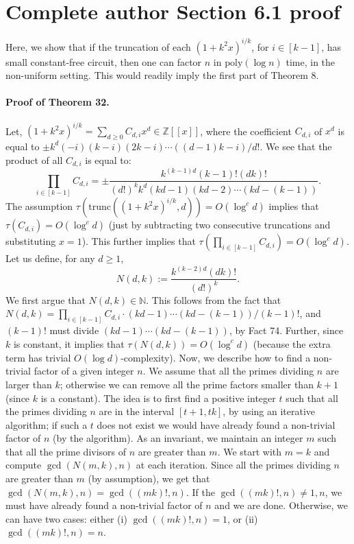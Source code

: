 \section*{Complete author Section 6.1 proof}
Here, we show that if the truncation of each $(1+k^2x)^{i/k}$, for $i\in[k-1]$, has small constant-free circuit, then one can factor $n$ in $\mathrm{poly}(\log n)$ time, in the non-uniform setting. This would readily imply the first part of Theorem 8.
\paragraph{Proof of Theorem 32.} Let, $(1+k^2x)^{i/k}=\sum_{d\ge0}C_{d,i}x^d\in\mathbb Z[[x]]$, where the coefficient $C_{d,i}$ of $x^d$ is equal to $\pm k^d(-i)(k-i)(2k-i)\cdots((d-1)k-i)/d!$. We see that the product of all $C_{d,i}$ is equal to:
\[\prod_{i\in[k-1]}C_{d,i}=\pm\frac{k^{(k-1)d}(k-1)!(dk)!}{(d!)^kk^d(kd-1)(kd-2)\cdots(kd-(k-1))}.\]
The assumption $\tau(\mathrm{trunc}((1+k^2x)^{i/k},d))=O(\log^cd)$ implies that $\tau(C_{d,i})=O(\log^cd)$ (just by subtracting two consecutive truncations and substituting $x=1$). This further implies that $\tau(\prod_{i\in[k-1]}C_{d,i})=O(\log^cd)$. Let us define, for any $d\ge1$,
\[N(d,k):=\frac{k^{(k-2)d}(dk)!}{(d!)^k}.\]
We first argue that $N(d,k)\in\mathbb N$. This follows from the fact that $N(d,k)=\prod_{i\in[k-1]}C_{d,i}\cdot(kd-1)\cdots(kd-(k-1))/(k-1)!$, and $(k-1)!$ must divide $(kd-1)\cdots(kd-(k-1))$, by Fact 74. Further, since $k$ is constant, it implies that $\tau(N(d,k))=O(\log^cd)$ (because the extra term has trivial $O(\log d)$-complexity).
Now, we describe how to find a non-trivial factor of a given integer $n$. We assume that all the primes dividing $n$ are larger than $k$; otherwise we can remove all the prime factors smaller than $k+1$ (since $k$ is a constant).
The idea is to first find a positive integer $t$ such that all the primes dividing $n$ are in the interval $[t+1,tk]$, by using an iterative algorithm; if such a $t$ does not exist we would have already found a non-trivial factor of $n$ (by the algorithm). As an invariant, we maintain an integer $m$ such that all the prime divisors of $n$ are greater than $m$. We start with $m=k$ and compute $\gcd(N(m,k),n)$ at each iteration. Since all the primes dividing $n$ are greater than $m$ (by assumption), we get that $\gcd(N(m,k),n)=\gcd((mk)!,n)$. If the $\gcd((mk)!,n)\ne1,n$, we must have already found a non-trivial factor of $n$ and we are done. Otherwise, we can have two cases: either (i) $\gcd((mk)!,n)=1$, or (ii) $\gcd((mk)!,n)=n$.
